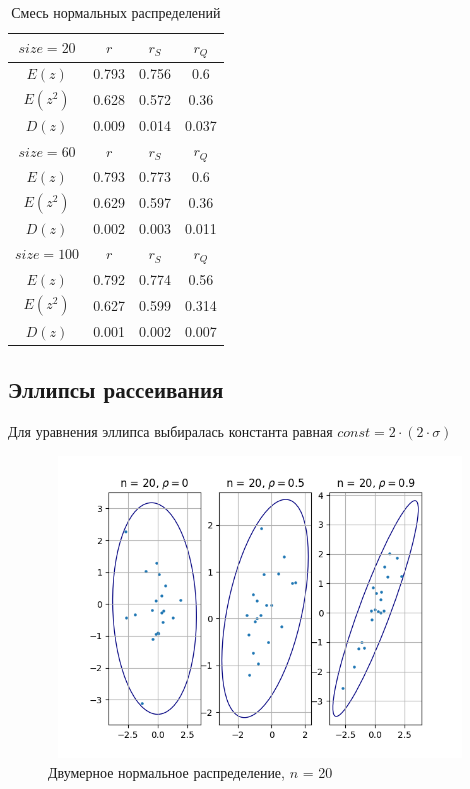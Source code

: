 \begin{table}[H]
	\centering
	\begin{tabular}{| c | c | c | c |}
		
		\hline
		$size = 20$ & $r$      & $r_{S}$ & $r_{Q}$ \\
		\hline
		$E(z)$       & 0.793 & 0.756 & 0.6   \\
		$E(z^2)$    & 0.628 & 0.572 & 0.36  \\
		$D(z)$       & 0.009 & 0.014 & 0.037 \\
		\hline
		$size = 60$ & $r$      & $r_{S}$ & $r_{Q}$ \\
		\hline
		$E(z)$       & 0.793 & 0.773 & 0.6   \\
		$E(z^2)$    & 0.629 & 0.597 & 0.36  \\
		$D(z)$      & 0.002 & 0.003 & 0.011 \\
		\hline
		$size = 100$ & $r$      & $r_{S}$ & $r_{Q}$ \\
		\hline
		$E(z)$        & 0.792 & 0.774 & 0.56  \\
		$E(z^2)$     & 0.627 & 0.599 & 0.314 \\
		$D(z)$        & 0.001 & 0.002 & 0.007 \\
		\hline
		
	\end{tabular}{}
	\caption{Смесь нормальных распределений}
	\label{tab:mix_normal}
\end{table}
\subsection{Эллипсы рассеивания}
\noindent Для уравнения эллипса выбиралась константа равная $const = 2 \cdot (2 \cdot \sigma)$

\begin{figure}[H]
	\centering
	\includegraphics[width = 13cm, height = 8cm]{resources/5_20.png}
	\caption{Двумерное нормальное распределение, $n$ = 20}
	\label{fig:n20}
\end{figure}


